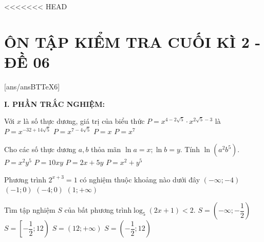<<<<<<< HEAD
\section*{ÔN TẬP KIỂM TRA CUỐI KÌ 2 - ĐỀ 06}
\setcounter{ex}{0}\setcounter{bt}{0}
[ans/ansBTTeX6]

\noindent\textbf{I. PHẦN TRẮC NGHIỆM:}
\begin{ex}
Với $x$ là số thực dương, giá trị của biểu thức $P={x^{4-2\sqrt{5}}} \cdot {x^{2\sqrt{5}-3}}$ là
\choice
{$P={x^{-32+14\sqrt{5}}}$}
{$P={x^{7-4\sqrt{5}}}$}
{\True $P=x$}
{$P=x^7$}
\end{ex}
\begin{ex}
Cho các số thực dương $a,b$ thỏa mãn $\ln a=x;\ln b=y$. Tính $\ln \left(a^2b^5\right)$.
\choice
{$P=x^2y^5$}
{$P=10xy$}
{\True $P=2x+5y$}
{$P=x^2+y^5$}
\end{ex}
\begin{ex}
\end{ex}
\begin{ex}
Phương trình ${2^{x+3}}=1$ có nghiệm thuộc khoảng nào dưới đây
\choice
{$\left(-\infty ;-4\right)$}
{$(-1;0)$}
{\True $(-4;0)$}
{$\left(1;+\infty\right)$}
\end{ex}
\begin{ex}
Tìm tập nghiệm $S$ của bất phương trình$\log _5(2x+1)<2$.
\choice
{$S=\left(-\infty ;-\dfrac{1}{2}\right)$}
{$S=\left[-\dfrac{1}{2};12\right)$}
{$S=\left(12;+\infty\right)$}
{\True $S=\left(-\dfrac{1}{2};12\right)$}
\end{ex}
